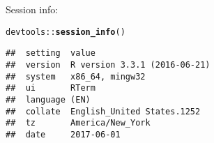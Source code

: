 \documentclass{article}\usepackage[]{graphicx}\usepackage[]{color}
\makeatletter
\newcommand{\hlopt}[1]{\textcolor[rgb]{0,0,0}{#1}}%
\newcommand{\hlstd}[1]{\textcolor[rgb]{0.345,0.345,0.345}{#1}}%
\newcommand{\hlkwd}[1]{\textcolor[rgb]{0.737,0.353,0.396}{\textbf{#1}}}%
\newenvironment{kframe}{%
 \def\at@end@of@kframe{}%
 \ifinner\ifhmode%
  \def\at@end@of@kframe{\end{minipage}}%
  \begin{minipage}{\columnwidth}%
 \fi\fi%
 \def\FrameCommand##1{\hskip\@totalleftmargin \hskip-\fboxsep
 \colorbox{shadecolor}{##1}\hskip-\fboxsep
     \hskip-\linewidth \hskip-\@totalleftmargin \hskip\columnwidth}%
 \MakeFramed {\advance\hsize-\width
   \@totalleftmargin\z@ \linewidth\hsize
   \@setminipage}}%
 {\par\unskip\endMakeFramed%
 \at@end@of@kframe}
\newenvironment{knitrout}{}{} %
\makeatother
\begin{document}
Session info:
\begin{knitrout}
\color{fgcolor}\begin{kframe}
\begin{alltt}
\hlstd{devtools}\hlopt{::}\hlkwd{session_info}\hlstd{()}
\end{alltt}


{\ttfamily\noindent\itshape\color{messagecolor}{\#\# Session info -----------------------------------------------}}\begin{verbatim}
##  setting  value                       
##  version  R version 3.3.1 (2016-06-21)
##  system   x86_64, mingw32             
##  ui       RTerm                       
##  language (EN)                        
##  collate  English_United States.1252  
##  tz       America/New_York            
##  date     2017-06-01
\end{verbatim}



\end{kframe}
\end{knitrout}
\end{document}
